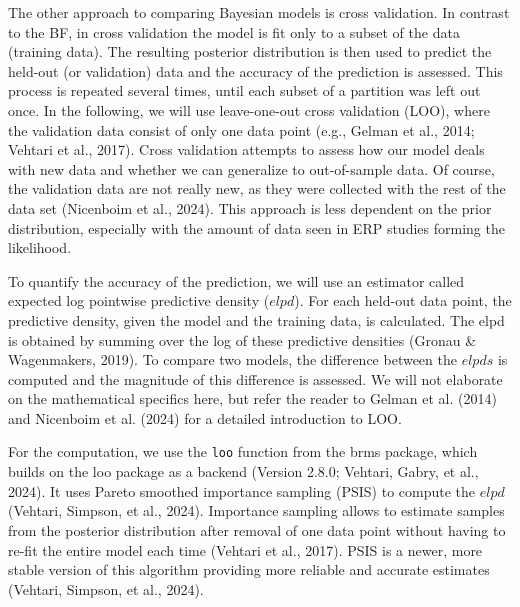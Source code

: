 \documentclass[
  doc,12pt,floatsintext]{apa7}
\begin{document}
The other approach to comparing Bayesian models is cross validation. In contrast to the BF, in cross validation the model is fit only to a subset of the data (training data). The resulting posterior distribution is then used to predict the held-out (or validation) data and the accuracy of the prediction is assessed. This process is repeated several times, until each subset of a partition was left out once. In the following, we will use leave-one-out cross validation (LOO), where the validation data consist of only one data point (e.g., Gelman et al., 2014; Vehtari et al., 2017). Cross validation attempts to assess how our model deals with new data and whether we can generalize to out-of-sample data. Of course, the validation data are not really new, as they were collected with the rest of the data set (Nicenboim et al., 2024). This approach is less dependent on the prior distribution, especially with the amount of data seen in ERP studies forming the likelihood.

To quantify the accuracy of the prediction, we will use an estimator called expected log pointwise predictive density (\(elpd\)). For each held-out data point, the predictive density, given the model and the training data, is calculated. The elpd is obtained by summing over the log of these predictive densities (Gronau \& Wagenmakers, 2019). To compare two models, the difference between the \(elpds\) is computed and the magnitude of this difference is assessed. We will not elaborate on the mathematical specifics here, but refer the reader to Gelman et al. (2014) and Nicenboim et al. (2024) for a detailed introduction to LOO.

For the computation, we use the \texttt{loo} function from the brms package, which builds on the loo package as a backend (Version 2.8.0; Vehtari, Gabry, et al., 2024). It uses Pareto smoothed importance sampling (PSIS) to compute the \(elpd\) (Vehtari, Simpson, et al., 2024). Importance sampling allows to estimate samples from the posterior distribution after removal of one data point without having to re-fit the entire model each time (Vehtari et al., 2017). PSIS is a newer, more stable version of this algorithm providing more reliable and accurate estimates (Vehtari, Simpson, et al., 2024).
\end{document}
